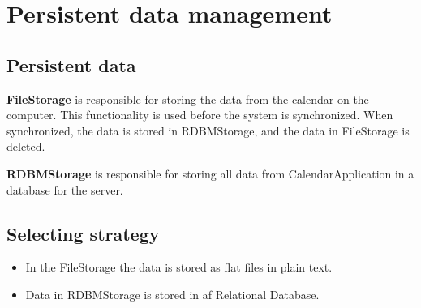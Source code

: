 \section{Persistent data management}
\subsection{Persistent data}

\textbf {FileStorage} is responsible for storing the data from the calendar on the computer. This functionality is used before the system is synchronized. When synchronized, the data is stored in RDBMStorage, and the data in FileStorage is deleted. 

\textbf{RDBMStorage} is responsible for storing all data from CalendarApplication in a database for the server. 


\subsection*{Selecting strategy}
\begin{itemize}
	\item In the FileStorage the data is stored as flat files in plain text. 
	\item Data in RDBMStorage is stored in af Relational Database. 
\end{itemize}